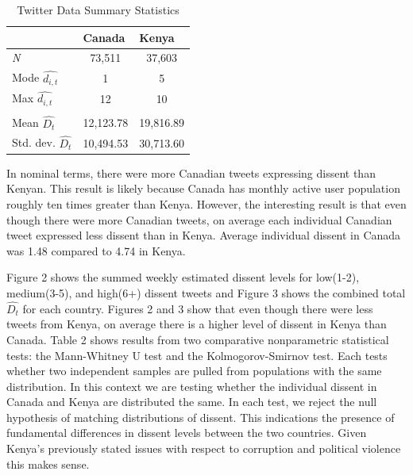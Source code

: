 \documentclass[12pt]{article}
\begin{document}
\begin{spacing}{1.5}
\begin{table}[]
\begin{spacing}{1}
\centering
\begin{tabular}{lcc}
\toprule
\multicolumn{1}{l}{} & \multicolumn{1}{l}{\textbf{Canada}} & \multicolumn{1}{l}{\textbf{Kenya}} \\ \hline
\textit{N} & 73,511 & 37,603 \\
Mode $\hat{d_{i,t}}$ & 1 & 5 \\
Max $\hat{d_{i,t}}$ & 12 & 10 \\
& & \\
Mean $\hat{D_t}$ & 12,123.78 & 19,816.89 \\
Std. dev. $\hat{D_t}$ & 10,494.53 & 30,713.60 \\
\hline
\end{tabular}
\caption{Twitter Data Summary Statistics}
\end{spacing}
\end{table}

In nominal terms, there were more Canadian tweets expressing dissent than Kenyan. This result is likely because Canada has monthly active user population roughly ten times greater than Kenya. However, the interesting result is that even though there were more Canadian tweets, on average each individual Canadian tweet expressed less dissent than in Kenya. Average individual dissent in Canada was 1.48 compared to 4.74 in Kenya. 

Figure 2 shows the summed weekly estimated dissent levels for low(1-2), medium(3-5), and high(6+) dissent tweets and Figure 3 shows the combined total $\hat{D_t}$ for each country. Figures 2 and 3 show that even though there were less tweets from Kenya, on average there is a higher level of dissent in Kenya than Canada. Table 2 shows results from two comparative nonparametric statistical tests: the Mann-Whitney U test and the Kolmogorov-Smirnov test. Each tests whether two independent samples are pulled from populations with the same distribution. In this context we are testing whether the individual dissent in Canada and Kenya are distributed the same. In each test, we reject the null hypothesis of matching distributions of dissent. This indications the presence of fundamental differences in dissent levels between the two countries. Given Kenya's previously stated issues with respect to corruption and political violence this makes sense. 


\end{spacing}
\end{document}

